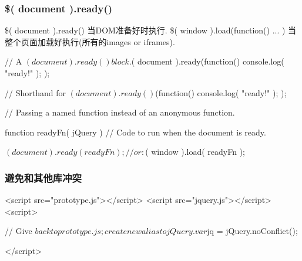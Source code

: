 \subsubsection{\$( document ).ready()}

\$( document ).ready() 当DOM准备好时执行. \$( window ).load(function() { ... }) 当整个页面加载好执行(所有的images or iframes).

\begin{JavaScript}
// A $( document ).ready() block.
$( document ).ready(function() {
    console.log( "ready!" );
});


// Shorthand for $( document ).ready()
$(function() {
    console.log( "ready!" );
});

// Passing a named function instead of an anonymous function.
 
function readyFn( jQuery ) {
    // Code to run when the document is ready.
}
 
$( document ).ready( readyFn );
// or:
$( window ).load( readyFn );

\end{JavaScript}

\subsubsection{避免和其他库冲突}

\begin{JavaScript}
<script src="prototype.js"></script>
<script src="jquery.js"></script>
<script>
 
// Give $ back to prototype.js; create new alias to jQuery.
var $jq = jQuery.noConflict();
 
</script>
\end{JavaScript}



